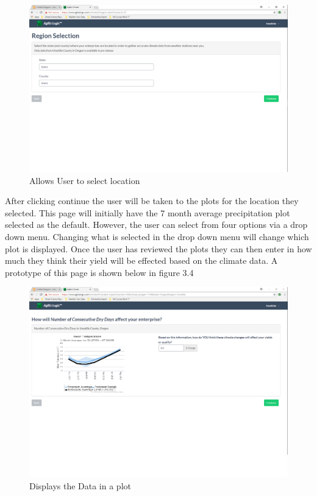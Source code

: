 \documentclass[onecolumn, draftclsnofoot,10pt, compsoc]{article}
\begin{document}
					\begin{figure}
						\includegraphics[width=\linewidth]{Figures/SelectStateAndCounty.PNG}
						\caption{Allows User to select location}
						\label{figure3.3}
					\end{figure}

					After clicking continue the user will be taken to the plots for the location they selected. This page will initially have the 7 month average precipitation plot selected as the default. However, the user can select from four options via a drop down menu. Changing what is selected in the drop down menu will change which plot is displayed. Once the user has reviewed the plots they can then enter in how much they think their yield will be effected based on the climate data. A prototype of this page is shown below in figure 3.4\\
					
					\begin{figure}
						\includegraphics[width=\linewidth]{Figures/ChartPage.PNG}
						\caption{Displays the Data in a plot}
						\label{figure3.4}
					\end{figure}
\end{document}
